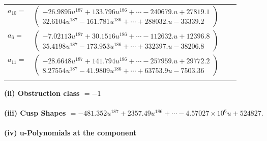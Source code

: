 \documentclass[1p]{elsarticle_modified}
\theoremstyle{definition}
\begin{document}
\begin{tabular}{m{7pt} m{180pt} m{7pt} m{180pt} }
\flushright $a_{10}=$&$\begin{pmatrix}-26.9895 u^{187}+133.796 u^{186}+\cdots-240679. u+27819.1\\32.6104 u^{187}-161.781 u^{186}+\cdots+288032. u-33339.2\end{pmatrix}$ \\
\flushright $a_{6}=$&$\begin{pmatrix}-7.02113 u^{187}+30.1516 u^{186}+\cdots-112632. u+12396.8\\35.4198 u^{187}-173.953 u^{186}+\cdots+332397. u-38206.8\end{pmatrix}$ \\
\flushright $a_{11}=$&$\begin{pmatrix}-28.6648 u^{187}+141.794 u^{186}+\cdots-257959. u+29772.2\\8.27554 u^{187}-41.9809 u^{186}+\cdots+63753.9 u-7503.36\end{pmatrix}$\\&\end{tabular}
\flushleft \textbf{(ii) Obstruction class $= -1$}\\~\\
\flushleft \textbf{(iii) Cusp Shapes $= -481.352 u^{187}+2357.49 u^{186}+\cdots-4.57027\times10^{6} u+524827.$}\\~\\
\newpage\renewcommand{\arraystretch}{1}
\flushleft \textbf{(iv) u-Polynomials at the component}\newline \\
\end{document}
